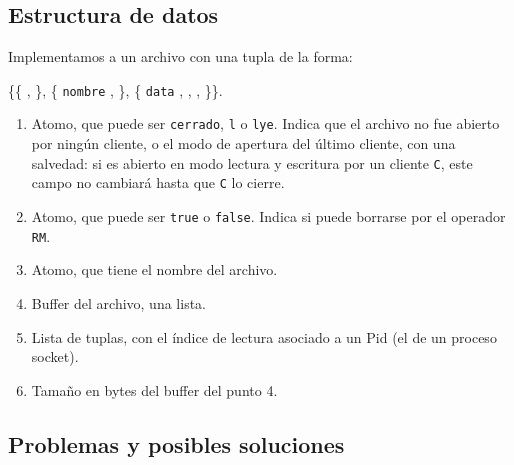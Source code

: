 \documentclass[a4paper, 8pt]{article}
\begin{document}
  
\subsection{Estructura de datos}

  Implementamos a un archivo con una tupla de la forma:

\vspace{2.5mm}

\{\{  ,  \}, \{ \texttt{nombre} ,  \}, \{ \texttt{data} ,  ,  ,  \}\}.

\vspace{2.5mm}

\begin{enumerate}
  \item Atomo, que puede ser \texttt{cerrado}, \texttt{l} o \texttt{lye}. Indica que el archivo no fue abierto por ningún cliente, o el modo de apertura del último cliente,
  con una salvedad:  si es abierto en modo lectura y escritura por un cliente \texttt{C}, este campo no cambiará hasta que \texttt{C} lo cierre.
  \item Atomo, que puede ser \texttt{true} o \texttt{false}. Indica si puede borrarse por el operador \texttt{RM}.
  \item Atomo, que tiene el nombre del archivo.
  \item Buffer del archivo, una lista.
  \item Lista de tuplas, con el índice de lectura asociado a un Pid (el de un proceso socket).
  \item Tamaño en bytes del buffer del punto 4.
\end{enumerate}

\subsection{Problemas y posibles soluciones}
\end{document}
